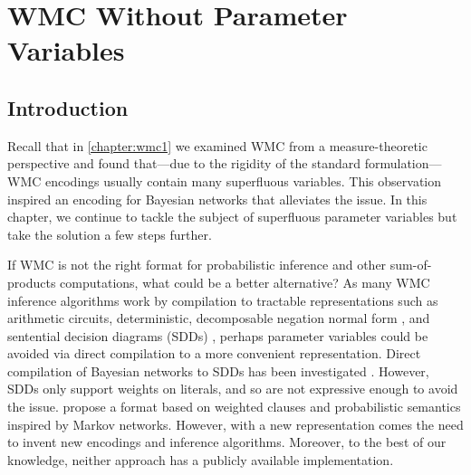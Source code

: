 \chapter{WMC Without Parameter Variables}\label{chapter:wmc2}

\section{Introduction}

Recall that in \cref{chapter:wmc1} we examined WMC from a measure-theoretic
perspective and found that---due to the rigidity of the standard
formulation---WMC encodings usually contain many superfluous variables. This
observation inspired an encoding for Bayesian networks that alleviates the
issue. In this chapter, we continue to tackle the subject of superfluous
parameter variables but take the solution a few steps further.

If WMC is not the right format for probabilistic inference and other
sum-of-products computations, what could be a better alternative? As many WMC
inference algorithms \citep{DBLP:conf/ecai/Darwiche04,DBLP:conf/ijcai/OztokD15}
work by compilation to tractable representations such as arithmetic circuits,
deterministic, decomposable negation normal form
\citep{DBLP:journals/jancl/Darwiche01}, and sentential decision diagrams (SDDs)
\citep{DBLP:conf/ijcai/Darwiche11}, perhaps parameter variables could be avoided
via direct compilation to a more convenient representation. Direct compilation
of Bayesian networks to SDDs has been investigated
\citep{DBLP:conf/ecsqaru/ChoiKD13}. However, SDDs only support weights on
literals, and so are not expressive enough to avoid the issue.
 propose a format based on weighted clauses and
probabilistic semantics inspired by Markov networks. However, with a new
representation comes the need to invent new encodings and inference algorithms.
Moreover, to the best of our knowledge, neither approach
\citep{DBLP:conf/ecsqaru/ChoiKD13,DBLP:conf/uai/GogateD10} has a publicly
available implementation.



